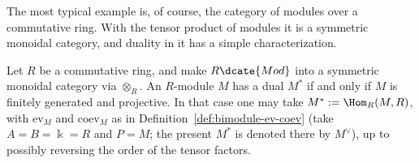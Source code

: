 The most typical example is, of course, the category of modules over a
commutative ring. With the tensor product of modules it is a symmetric
monoidal category, and duality in it has a simple characterization.

\begin{proposition}\label{prop:dualizable-module}
	Let $R$ be a commutative ring, and make $R\dcate{Mod}$ into a symmetric
	monoidal category via $\otimes_R$. An $R$-module $M$ has a dual $M^*$ if
	and only if $M$ is finitely generated and projective. In that case one may
	take $M^*:=\Hom_R(M,R)$, with $\mathrm{ev}_M$ and $\mathrm{coev}_M$ as in
	Definition~\ref{def:bimodule-ev-coev} (take $A=B=\Bbbk=R$ and $P=M$;
	the present $M^*$ is denoted there by $M^\vee$), up to possibly reversing
	the order of the tensor factors.
\end{proposition}
